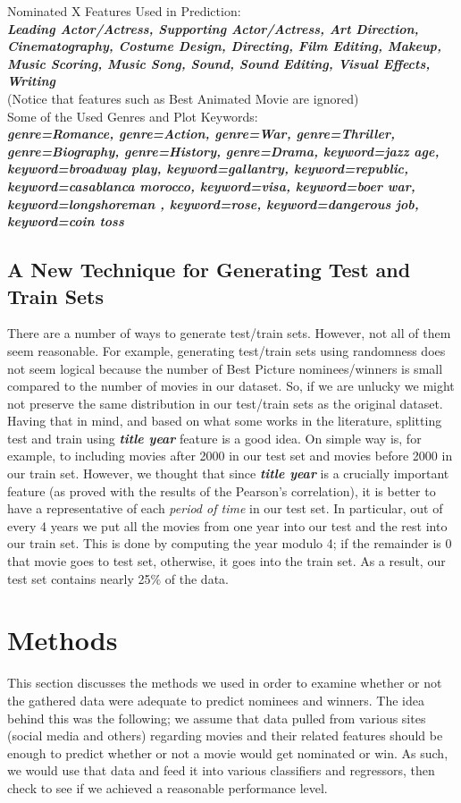 \documentclass[journal,transmag]{IEEEtran}
\begin{document}
\noindent
Nominated X Features Used in Prediction:\\
\textit{\textbf{Leading Actor/Actress, Supporting	 Actor/Actress, Art Direction, Cinematography, Costume Design, Directing, Film Editing, Makeup,  Music Scoring, Music Song, Sound, Sound Editing, Visual Effects, Writing }}\\ 
(Notice that features such as Best Animated Movie are ignored)\\

\noindent
Some of the Used Genres and Plot Keywords:\\
\textit{\textbf{genre=Romance,	genre=Action,	genre=War,	genre=Thriller,	genre=Biography,	 genre=History,	genre=Drama, keyword=jazz age,	keyword=broadway play,	keyword=gallantry,	keyword=republic,	keyword=casablanca morocco,	keyword=visa,	keyword=boer war,	keyword=longshoreman	, keyword=rose, 	keyword=dangerous job,	keyword=coin toss}}

\subsection{A New Technique for Generating Test and Train Sets} \label{train_test_set}
There are a number of ways to generate test/train sets. However, not all of them seem reasonable. For example, generating test/train sets using randomness does not seem logical because the number of Best Picture nominees/winners is small compared to the number of movies in our dataset. So, if we are unlucky we might not preserve the same distribution in our test/train sets as the original dataset. \\
Having that in mind, and based on what some works in the literature, splitting test and train using \textbf{\textit{title year}} feature is a good idea. On simple way is, for example, to including movies after 2000 in our test set and movies before 2000 in our train set. However, we thought that since \textbf{\textit{title year}} is a crucially important feature (as proved with the results of the Pearson's correlation), it is better to have a representative of each \textit{period of time} in our test set. In particular, out of every 4 years we put all the movies from one year into our test and the rest into our train set. This is done by computing the year modulo 4; if the remainder is 0 that movie goes to test set, otherwise, it goes into the train set. As a result, our test set contains nearly 25$\%$ of the data.


	
	
	\section{Methods}
	This section discusses the methods we used in order to examine whether or not the gathered data were adequate to predict nominees and winners. The idea behind this was the following; we assume that data pulled from various sites (social media and others) regarding movies and their related features should be enough to predict whether or not a movie would get nominated or win. As such, we would use that data and feed it into various classifiers and regressors, then check to see if we achieved a reasonable performance level.
	
\end{document}
